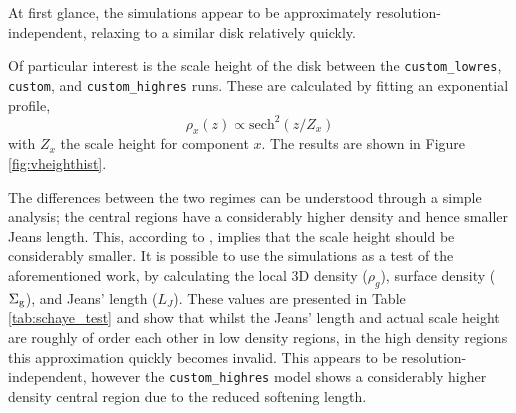 At first glance, the simulations appear to be approximately resolution-independent, relaxing to a similar disk relatively quickly.

Of particular interest is the scale height of the disk between the {\tt custom\_lowres}, {\tt custom}, and {\tt custom\_highres} runs.
These are calculated by fitting an exponential profile,
$$
    \rho_x(z) \propto \mathrm{sech}^2\left(z/Z_x\right)
$$
with $Z_x$ the scale height for component $x$. The results are shown in Figure \ref{fig:vheighthist}.

The differences between the two regimes can be understood through a simple \citet{jeans_stability_1902} analysis; the central regions have a considerably higher density and hence smaller Jeans length.
This, according to \citet{schaye_model-independent_2001}, implies that the scale height should be considerably smaller.
It is possible to use the simulations as a test of the aforementioned work, by calculating the local 3D density ($\rho_g$), surface density ($\Sigma_\mathrm{g}$), and Jeans' length ($L_J$).
These values are presented in Table \ref{tab:schaye_test} and show that whilst the Jeans' length and actual scale height are roughly of order each other in low density regions, in the high density regions this approximation quickly becomes invalid.
This appears to be resolution-independent, however the {\tt custom\_highres} model shows a considerably higher density central region due to the reduced softening length.

